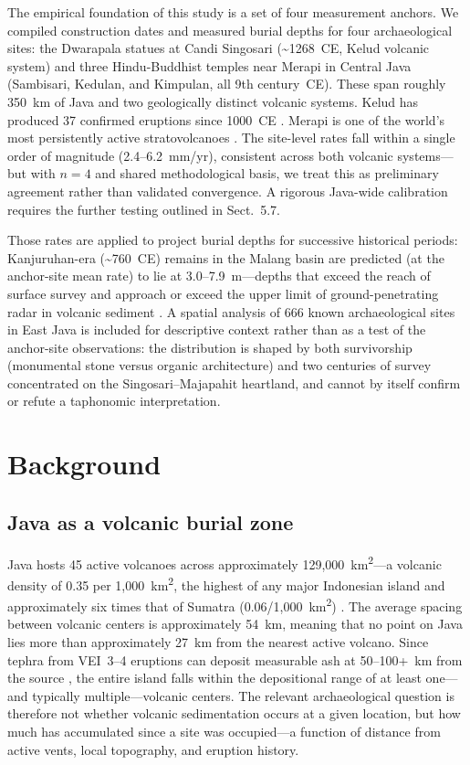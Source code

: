 \documentclass[12pt,a4paper]{article}
\begin{document}
The empirical foundation of this study is a set of four measurement anchors. We compiled construction dates and measured burial depths for four archaeological sites: the Dwarapala statues at Candi Singosari (\textasciitilde1268~CE, Kelud volcanic system) and three Hindu-Buddhist temples near Merapi in Central Java (Sambisari, Kedulan, and Kimpulan, all 9th century~CE). These span roughly 350~km of Java and two geologically distinct volcanic systems. Kelud has produced 37 confirmed eruptions since 1000~CE \citep{gvp2024}. Merapi is one of the world's most persistently active stratovolcanoes \citep{gertisser2012}. The site-level rates fall within a single order of magnitude (2.4--6.2~mm/yr), consistent across both volcanic systems---but with $n=4$ and shared methodological basis, we treat this as preliminary agreement rather than validated convergence. A rigorous Java-wide calibration requires the further testing outlined in Sect.~5.7.

Those rates are applied to project burial depths for successive historical periods: Kanjuruhan-era (\textasciitilde760~CE) remains in the Malang basin are predicted (at the anchor-site mean rate) to lie at 3.0--7.9~m---depths that exceed the reach of surface survey and approach or exceed the upper limit of ground-penetrating radar in volcanic sediment \citep{putra2019,conyers2004}. A spatial analysis of 666 known archaeological sites in East Java is included for descriptive context rather than as a test of the anchor-site observations: the distribution is shaped by both survivorship (monumental stone versus organic architecture) and two centuries of survey concentrated on the Singosari--Majapahit heartland, and cannot by itself confirm or refute a taphonomic interpretation.


\section{Background}

\subsection{Java as a volcanic burial zone}

Java hosts 45 active volcanoes across approximately 129,000~km\textsuperscript{2}---a volcanic density of 0.35 per 1,000~km\textsuperscript{2}, the highest of any major Indonesian island and approximately six times that of Sumatra (0.06/1,000~km\textsuperscript{2}) \citep{vanbemmelen1949}. The average spacing between volcanic centers is approximately 54~km, meaning that no point on Java lies more than approximately 27~km from the nearest active volcano. Since tephra from VEI~3--4 eruptions can deposit measurable ash at 50--100+~km from the source \citep{newhall1982}, the entire island falls within the depositional range of at least one---and typically multiple---volcanic centers. The relevant archaeological question is therefore not whether volcanic sedimentation occurs at a given location, but how much has accumulated since a site was occupied---a function of distance from active vents, local topography, and eruption history.
\end{document}
